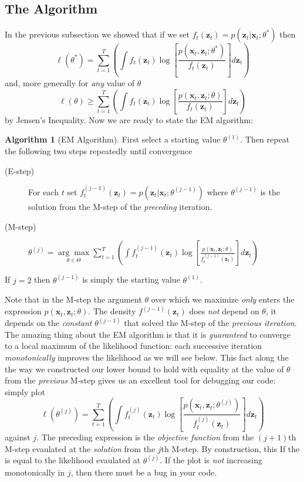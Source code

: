 \documentclass[12pt]{article}
\theoremstyle{definition}
\newtheorem{alg}{Algorithm}[section]
\begin{document}
\subsection{The Algorithm}
In the previous subsection we showed that if we set $f_t(\mathbf{z}_t) = p(\textbf{z}_t|\textbf{x}_t;\theta^*)$ then
	$$\ell(\theta^*) = \sum_{t = 1}^T  \left(\int f_t(\mathbf{z}_t) \log\left[\frac{p(\textbf{x}_t,\textbf{z}_t;\theta^*)}{f_t(\mathbf{z}_t)}\right] d \textbf{z}_t \right)$$
and, more generally for \emph{any} value of $\theta$
	$$\ell(\theta) \geq \sum_{t = 1}^T  \left(\int f_t(\mathbf{z}_t) \log\left[\frac{p(\textbf{x}_t,\textbf{z}_t;\theta)}{f_t(\mathbf{z}_t)}\right] d \textbf{z}_t \right)$$
by Jensen's Inequality. Now we are ready to state the EM algorithm:
\begin{alg}[EM Algorithm]
First select a starting value $\theta^{(1)}$. Then repeat the following two steps repeatedly until convergence
			\begin{description}
			 	\item[(E-step)] For each $t$ set $f_t^{(j-1)}(\mathbf{z}_t) = p(\mathbf{z}_t|\mathbf{x}_t; \theta^{(j-1)})$ where $\theta^{(j-1)}$ is the solution from the M-step of the \emph{preceding} iteration. 
			 	\item[(M-step)] 
			 		$\displaystyle\theta^{(j)} = \underset{\theta \in \Theta}{\arg \max} \sum_{t = 1}^T  \left(\int f_t^{(j-1)}(\mathbf{z}_t) \log\left[\frac{p(\textbf{x}_t,\textbf{z}_t;\theta)}{f_t^{(j-1)}(\mathbf{z}_t)}\right] d \textbf{z}_t \right)$
			 \end{description}
If $j = 2$ then $\theta^{(j-1)}$ is simply the starting value $\theta^{(1)}$.
\end{alg}
Note that in the M-step the argument $\theta$ over which we maximize \emph{only} enters the expression $p(\textbf{x}_t,\textbf{z}_t;\theta)$. The density $f^{(j-1)}(\mathbf{z}_t)$ does \emph{not} depend on $\theta$, it depends on the \emph{constant} $\theta^{(j-1)}$ that solved the M-step of the \emph{previous iteration}. The amazing thing about the EM algorithm is that it is \emph{guaranteed} to converge to a local maximum of the likelihood function: each successive iteration \emph{monotonically} improves the likelihood as we will see below. This fact along the the way we constructed our lower bound to hold with equality at the value of $\theta$ from the \emph{previous} M-step gives us an excellent tool for debugging our code: simply plot
	$$\ell(\theta^{(j)}) = \sum_{t = 1}^T  \left(\int f_t^{(j)}(\mathbf{z}_t) \log\left[\frac{p(\textbf{x}_t,\textbf{z}_t;\theta^{(j)})}{f_t^{(j)}(\mathbf{z}_t)}\right] d \textbf{z}_t \right)$$ 
against $j$. The preceding expression is the \emph{objective function} from the $(j+1)$th M-step evaulated at the \emph{solution} from the $j$th M-step. By construction, this If the is equal to the likelihood evaulated at $\theta^{(j)}$. If the plot is \emph{not} increasing monotonically in $j$, then there must be a bug in your code.
\end{document}
